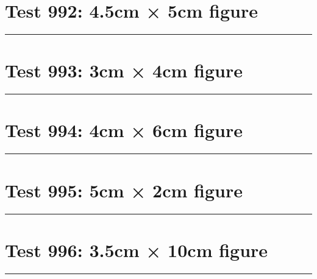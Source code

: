 \documentclass[a4paper,11pt]{article}
\begin{document}
\section*{Test 992: 4.5cm × 5cm figure}
\begin{swarmwrap}%
  \begin{minipage}[t]{4cm}
    \centering
    \rule{\linewidth}{5cm}
  \end{minipage}%
\end{swarmwrap}%
\swarmwrapnext
\lipsum[90]
\lipsum[91]
\lipsum[92]
\lipsum[93]
\section*{Test 993: 3cm × 4cm figure}
\begin{swarmwrap}%
  \begin{minipage}[t]{3cm}
    \centering
    \rule{\linewidth}{4cm}
  \end{minipage}%
\end{swarmwrap}%
\swarmwrapnext
\lipsum[100]
\lipsum[101]
\lipsum[102]
\section*{Test 994: 4cm × 6cm figure}
\begin{swarmwrap}%
  \begin{minipage}[t]{4cm}
    \centering
    \rule{\linewidth}{6cm}
  \end{minipage}%
\end{swarmwrap}%
\swarmwrapnext
\lipsum[18]
\lipsum[19]
\lipsum[20]
\lipsum[21]
\section*{Test 995: 5cm × 2cm figure}
\begin{swarmwrap}%
  \begin{minipage}[t]{5cm}
    \centering
    \rule{\linewidth}{2cm}
  \end{minipage}%
\end{swarmwrap}%
\swarmwrapnext
\lipsum[76]
\lipsum[77]
\lipsum[78]
\lipsum[79]
\lipsum[80]
\section*{Test 996: 3.5cm × 10cm figure}
\begin{swarmwrap}%
  \begin{minipage}[t]{3cm}
    \centering
    \rule{\linewidth}{10cm}
  \end{minipage}%
\end{swarmwrap}%
\swarmwrapnext
\lipsum[113]
\lipsum[114]
\lipsum[115]
\lipsum[116]
\lipsum[117]
\end{document}
